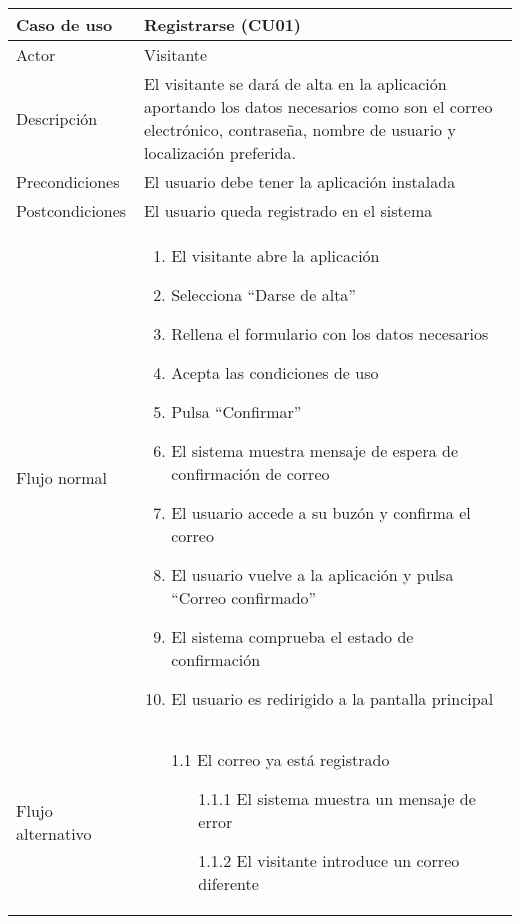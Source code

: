 \begin{table}[h]
    \centering
    \begin{tabular}{|m{3cm}|m{11cm}|}
        \hline
        \rowcolor{blue!20} Caso de uso & Registrarse (CU01) \\
        \hline
        Actor & Visitante \\
        \hline
        \rowcolor{blue!20} Descripción & El visitante se dará de alta en la aplicación aportando los datos necesarios como son el correo electrónico, contraseña, nombre de usuario y localización preferida. \\
        \hline
        Precondiciones & El usuario debe tener la aplicación instalada \\
        \hline
        \rowcolor{blue!20} Postcondiciones & El usuario queda registrado en el sistema \\
        \hline
        Flujo normal & 
            \begin{enumerate}[noitemsep]
            \item El visitante abre la aplicación
            \item Selecciona \enquote{Darse de alta}
            \item Rellena el formulario con los datos necesarios
            \item Acepta las condiciones de uso
            \item Pulsa \enquote{Confirmar}
            \item El sistema muestra mensaje de espera de confirmación de correo
            \item El usuario accede a su buzón y confirma el correo
            \item El usuario vuelve a la aplicación y pulsa \enquote{Correo confirmado}
            \item El sistema comprueba el estado de confirmación
            \item El usuario es redirigido a la pantalla principal
            \end{enumerate}
         \\
        \hline
        Flujo alternativo & 
        \begin{enumerate}[noitemsep]
            \item[1.1] El correo ya está registrado
            \begin{enumerate}[noitemsep]
                \item[1.1.1] El sistema muestra un mensaje de error
                \item[1.1.2] El visitante introduce un correo diferente

\end{enumerate}
\end{enumerate}
\end{tabular}
\end{table}
